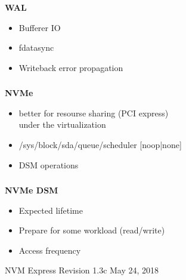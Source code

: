 \documentclass[usenames,dvipsnames, 18pt, compress, aspectratio=169]{beamer}
\begin{document}
\begin{frame}
\begin{center}
{
        }

    \end{center}
\end{frame}

\begin{frame}
    \frametitle{}
    \begin{center}
    \textbf{WAL}

        \begin{itemize}[label={\MVRightarrow}]
            \item Bufferer IO
            \item fdatasync
            \item Writeback error propagation
        \end{itemize}

    \end{center}
\end{frame}

\begin{frame}
    \frametitle{}
    \begin{center}
    \textbf{NVMe}

        \begin{itemize}[label={\MVRightarrow}]
            \item better for resourse sharing (PCI express) \\
                under the virtualization
            \item /sys/block/sda/queue/scheduler [noop|none]
            \item DSM operations
        \end{itemize}

    \end{center}
\end{frame}

\begin{frame}
    \frametitle{}
    \begin{center}
    \textbf{NVMe DSM}

        \begin{itemize}[label={\MVRightarrow}]
            \item Expected lifetime
            \item Prepare for some workload (read/write)
            \item Access frequency
        \end{itemize}

        \normalsize{NVM Express Revision 1.3c May 24, 2018}
    \end{center}
\end{frame}
\end{document}
